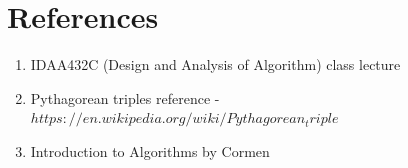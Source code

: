 \documentclass[twocolumn]{article}      %
\begin{document}
\section{References}
\begin{enumerate}
\item IDAA432C (Design and Analysis of Algorithm) class lecture
\item Pythagorean triples reference -\\${https://en.wikipedia.org/wiki/Pythagorean_triple}$
\item Introduction to Algorithms by Cormen
\end{enumerate}
\end{document}
